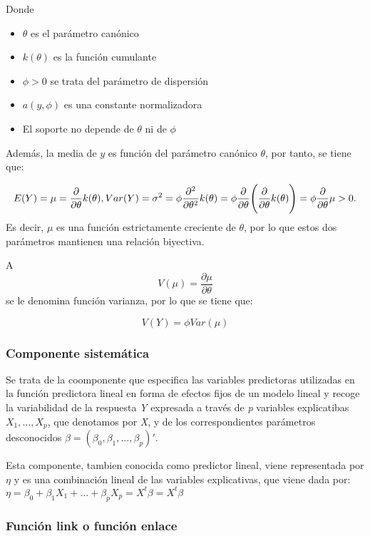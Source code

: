 \documentclass[12pt,a4paper,]{book}
\providecommand{\tightlist}{%
  \setlength{\itemsep}{0pt}\setlength{\parskip}{0pt}}
\numberwithin{dummy}{section}
\theoremstyle{ocrenumbox}
\theoremstyle{blacknumex}
\theoremstyle{blacknumbox}
\theoremstyle{ocrenum}
\theoremstyle{ocrenum}
\begin{document}
Donde

\begin{itemize}
\tightlist
\item
  \(\theta\) es el parámetro canónico
\item
  \(k(\theta)\) es la función cumulante
\item
  \(\phi > 0\) se trata del parámetro de dispersión
\item
  \(a(y,\phi)\) es una constante normalizadora
\item
  El soporte no depende de \(\theta\) ni de \(\phi\)
\end{itemize}

Además, la media de \(y\) es función del parámetro canónico \(\theta\),
por tanto, se tiene que:

\[
E(Y) = \mu = \dfrac{\partial}{\partial \theta} k(\theta), \\
Var(Y)= \sigma^2 =\phi  \dfrac{\partial^2}{\partial \theta^2} k(\theta) =\phi \dfrac{\partial}{\partial \theta} \Bigg( \dfrac{\partial}{\partial \theta} k(\theta)  \Bigg) = \phi\dfrac{\partial }{\partial \theta}\mu > 0 .
\] Es decir, \(\mu\) es una función estrictamente creciente de
\(\theta\), por lo que estos dos parámetros mantienen una relación
biyectiva.

A \[
V(\mu) = \frac{\partial \mu}{\partial \theta}
\] se le denomina función varianza, por lo que se tiene que:

\[
V(Y) = \phi Var(\mu)
\]

\hypertarget{componente-sistemuxe1tica}{%
\subsubsection{Componente sistemática}\label{componente-sistemuxe1tica}}

Se trata de la coomponente que especifica las variables predictoras
utilizadas en la función predictora lineal en forma de efectos fijos de
un modelo lineal y recoge la variabilidad de la respuesta \emph{Y}
expresada a través de \emph{p} variables explicatibas \(X_1,\dots,X_p\),
que denotamos por \emph{X}, y de los correspondientes parámetros
desconocidos \(\beta=(\beta_0,\beta_1,\dots,\beta_p)'\).

Esta componente, tambien conocida como predictor lineal, viene
representada por \(\eta\) y es una combinación lineal de las variables
explicativas, que viene dada por:
\(\eta =\beta_0 + \beta_1X_1+ \dots + \beta_pX_p= X^t\beta = X^t\beta\)

\hypertarget{funciuxf3n-link-o-funciuxf3n-enlace}{%
\subsubsection{Función link o función
enlace}\label{funciuxf3n-link-o-funciuxf3n-enlace}}
\end{document}
